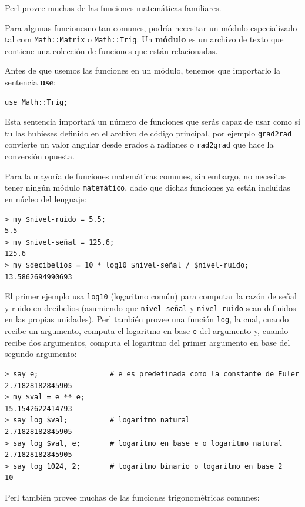 Perl provee muchas de las funciones matemáticas familiares.

Para algunas funcionesno tan comunes, podría necesitar un
módulo especializado tal com \verb'Math::Matrix' o
\verb'Math::Trig'. Un {\bf módulo} es un archivo de texto 
que contiene una colección de funciones que están relacionadas.

Antes de que usemos las funciones en un módulo, tenemos que importarlo
la sentencia {\bf use}:

\begin{lstlisting}
use Math::Trig;
\end{lstlisting}
%
Esta sentencia importará un número de funciones que serás capaz de usar
como si tu las hubieses definido en el archivo de código principal,
por ejemplo \verb|grad2rad| convierte un valor angular desde grados
a radianes o \verb|rad2grad| que hace la conversión opuesta.

Para la mayoría de funciones matemáticas comunes, sin embargo, no necesitas
tener ningún módulo \verb|matemático|, dado que dichas funciones
ya están incluidas en núcleo del lenguaje:

\begin{lstlisting}
> my $nivel-ruido = 5.5;
5.5
> my $nivel-señal = 125.6;
125.6
> my $decibelios = 10 * log10 $nivel-señal / $nivel-ruido;
13.5862694990693
\end{lstlisting}
%
El primer ejemplo usa \verb"log10" (logaritmo común)
para computar la razón de señal y ruido en decibelios
(asumiendo que \verb|nivel-señal| y \verb|nivel-ruido| sean 
definidos en las propias unidades). Perl también provee una 
función {\tt log}, la cual, cuando recibe un argumento,
computa el logaritmo en base {\tt e} del argumento y,
cuando recibe dos argumentos, computa el logaritmo del primer
argumento en base del segundo argumento:

\begin{lstlisting}
> say e;                 # e es predefinada como la constante de Euler
2.71828182845905
> my $val = e ** e;
15.1542622414793
> say log $val;          # logaritmo natural
2.71828182845905
> say log $val, e;       # logaritmo en base e o logaritmo natural
2.71828182845905
> say log 1024, 2;       # logaritmo binario o logaritmo en base 2
10
\end{lstlisting}
%

Perl también provee muchas de las funciones trigonométricas
comunes:

